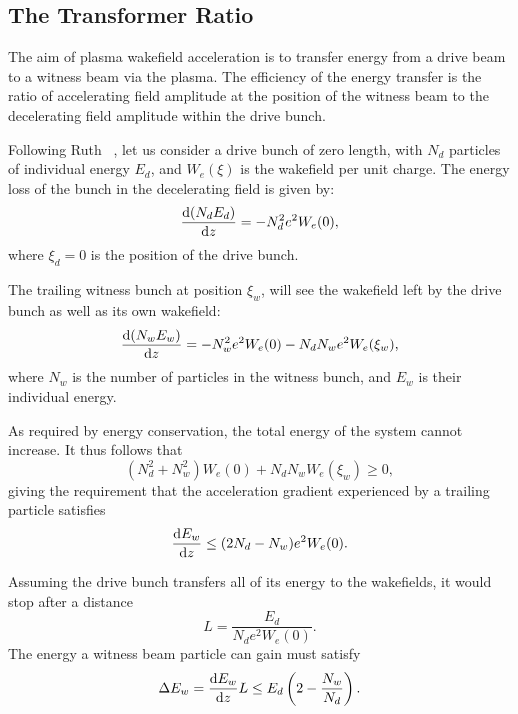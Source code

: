 \subsection{The Transformer Ratio}
\label{Int:BPI:TRat}

The aim of plasma wakefield acceleration is to transfer energy from a drive beam to a witness beam via the plasma.
The efficiency of the energy transfer is the ratio of accelerating field amplitude at the position of the witness beam to the decelerating field amplitude within the drive bunch.

Following Ruth \etal~\cite{ruth:1985}, let us consider a drive bunch of zero length, with $N_{d}$ particles of individual energy $E_{d}$, and $W_{e}(\xi)$ is the wakefield per unit charge.
The energy loss of the bunch in the decelerating field is given by:
\begin{equation}
    \frac{\mathrm{d} (N_{d}E_{d})}{\mathrm{d} z} = - N_{d}^{2}e^{2}W_{e}(0), \label{EQ:TRat:Drive}
\end{equation}
where $\xi_{d} = 0$ is the position of the drive bunch.

The trailing witness bunch at position $\xi_{w}$, will see the wakefield left by the drive bunch as well as its own wakefield:
\begin{equation}
    \frac{\mathrm{d} (N_{w}E_{w})}{\mathrm{d} z}
        = - N_{w}^{2}e^{2}W_{e}(0) - N_{d}N_{w}e^{2}W_{e}(\xi_{w}), \label{EQ:TRat:Witness}
\end{equation}
where $N_{w}$ is the number of particles in the witness bunch, and $E_{w}$ is their individual energy.

As required by energy conservation, the total energy of the system cannot increase.
It thus follows that
\begin{equation}
    (N_{d}^{2} + N_{w}^{2})W_{e}(0) + N_{d}N_{w}W_{e}(\xi_{w}) \geq 0, \label{EQ:TRat:EConv}
\end{equation}
giving the requirement that the acceleration gradient experienced by a trailing particle satisfies
\begin{equation}
    \frac{\mathrm{d} E_{w}}{\mathrm{d} z} \leq (2N_{d} - N_{w})e^{2}W_{e}(0). \label{EQ:TRat:Grad}
\end{equation}

Assuming the drive bunch transfers all of its energy to the wakefields, it would stop after a distance
\begin{equation}
    L = \frac{E_{d}}{N_{d}e^{2}W_{e}(0)}. \label{EQ:Trat:LStop}
\end{equation}
The energy a witness beam particle can gain must satisfy
\begin{equation}
    \Delta E_{w} = \frac{\mathrm{d} E_{w}}{\mathrm{d} z}L
                 \leq E_{d}\left(2-\frac{N_{w}}{N_{d}}\right). \label{EQ:TRat:DeltaE}
\end{equation}

